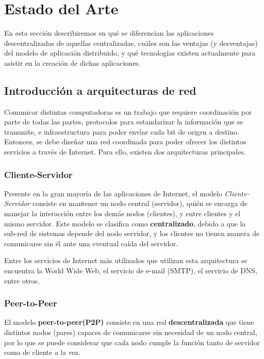 \section{Estado del Arte}
En esta sección describiremos en qué se diferencian las aplicaciones descentralizadas de aquellas centralizadas, cuáles son las ventajas (y desventajas) del modelo de aplicación distribuido, y qué tecnologías existen actualmente para asistir en la creación de dichas aplicaciones. 

\subsection{Introducción a arquitecturas de red}
Comunicar distintas computadoras es un trabajo que requiere coordinación por parte de todas las partes, protocolos para estandarizar la información que se transmite, e infraestructura para poder envíar cada bit de origen a destino. Entonces, se debe diseñar una red coordinada para poder ofrecer los distintos servicios a través de Internet. Para ello, existen dos arquitecturas principales.

\subsubsection*{Cliente-Servidor}

Presente en la gran mayoría de las aplicaciones de Internet, el modelo \textit{Cliente-Servidor} consiste en mantener un nodo central (servidor), quién se encarga de manejar la interacción entre los demás nodos (clientes), y entre clientes y el mismo servidor. Este modelo se clasifica como \textbf{centralizado}, debido a que la sub-red de sistemas depende del nodo servidor, y los clientes no tienen manera de comunicarse sin él ante una eventual caída del servidor.

Entre los servicios de Internet más utilizados que utilizan esta arquitectura se encuentra la World Wide Web, el servicio de e-mail (SMTP), el servicio de DNS, entre otros.

\subsubsection*{Peer-to-Peer}
El modelo \textbf{peer-to-peer(P2P)} consiste en una red \textbf{descentralizada} que tiene distintos nodos (pares) capaces de comunicarse sin necesidad de un nodo central, por lo que se puede considerar que cada nodo cumple la función tanto de servidor como de cliente a la vez.

